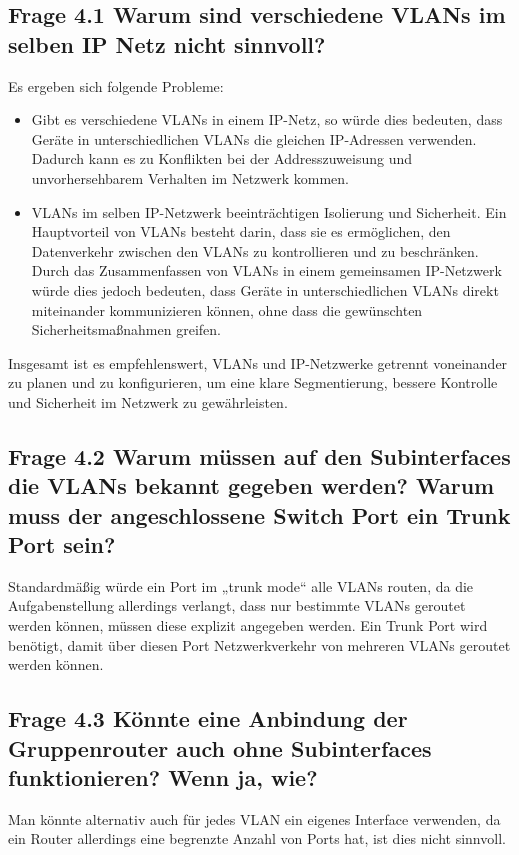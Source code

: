 \documentclass{article}
\begin{document}
\subsection*{Frage 4.1 \normalfont Warum sind verschiedene VLANs im selben IP Netz nicht sinnvoll?}
Es ergeben sich folgende Probleme:
\begin{itemize}
\item Gibt es verschiedene VLANs in einem IP-Netz, so würde dies bedeuten, dass Geräte in unterschiedlichen VLANs die gleichen IP-Adressen verwenden. Dadurch kann es zu Konflikten bei der Addresszuweisung und unvorhersehbarem Verhalten im Netzwerk kommen.
\item VLANs im selben IP-Netzwerk beeinträchtigen Isolierung und Sicherheit. Ein Hauptvorteil von VLANs besteht darin, dass sie es ermöglichen, den Datenverkehr zwischen den VLANs zu kontrollieren und zu beschränken. Durch das Zusammenfassen von VLANs in einem gemeinsamen IP-Netzwerk würde dies jedoch bedeuten, dass Geräte in unterschiedlichen VLANs direkt miteinander kommunizieren können, ohne dass die gewünschten Sicherheitsmaßnahmen greifen.
\end{itemize}
Insgesamt ist es empfehlenswert, VLANs und IP-Netzwerke getrennt voneinander zu planen und zu konfigurieren, um eine klare Segmentierung, bessere Kontrolle und Sicherheit im Netzwerk zu gewährleisten.


\subsection*{Frage 4.2 \normalfont Warum müssen auf den Subinterfaces die VLANs bekannt gegeben werden? Warum muss der angeschlossene Switch Port ein Trunk Port sein?}
Standardmäßig würde ein Port im „trunk mode“ alle VLANs routen, da die Aufgabenstellung allerdings verlangt, dass nur bestimmte VLANs geroutet werden können, müssen diese explizit angegeben werden. Ein Trunk Port wird benötigt, damit über diesen Port Netzwerkverkehr von mehreren VLANs geroutet werden können.

\subsection*{Frage 4.3 \normalfont Könnte eine Anbindung der Gruppenrouter auch ohne Subinterfaces funktionieren? Wenn ja, wie?}
Man könnte alternativ auch für jedes VLAN ein eigenes Interface verwenden, da ein Router allerdings eine begrenzte Anzahl von Ports hat, ist dies nicht sinnvoll.
\end{document}
